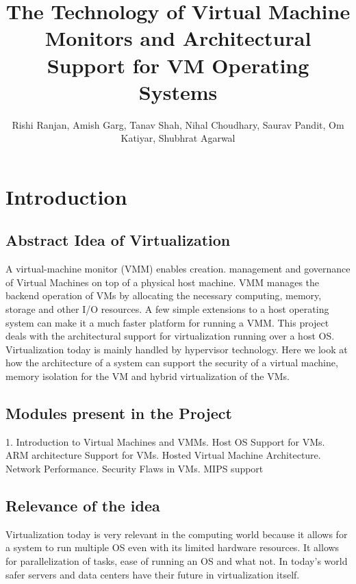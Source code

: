 \documentclass[runningheads]{llncs}
\begin{document}
\title{The Technology of Virtual Machine Monitors and Architectural Support for VM Operating Systems}
%
\author{Rishi Ranjan, Amish Garg, Tanav Shah, Nihal Choudhary, Saurav Pandit, Om Katiyar, Shubhrat Agarwal }
%
\maketitle              %
%
%
%
%
\section{Introduction}
\subsection{Abstract Idea of Virtualization}
\large A virtual-machine monitor (VMM) enables creation. management and governance of Virtual Machines on top of a physical host machine. VMM manages the backend operation of VMs by allocating the necessary computing, memory, storage and other I/O resources. A few simple extensions to a host operating system can make it a much faster platform for running a VMM. This project deals with the architectural support for virtualization running over a host OS. Virtualization today is mainly handled by hypervisor technology. Here we look at how the architecture of a system can support the security of a virtual machine, memory isolation for the VM and hybrid virtualization of the VMs.

\subsection{Modules present in the Project}
1. Introduction to Virtual Machines and VMMs. Host OS Support for VMs. ARM architecture Support for VMs. Hosted Virtual Machine Architecture. Network Performance. Security Flaws in VMs. MIPS support

\subsection{Relevance of the idea}
 Virtualization today is very relevant in the computing world because it allows for a system to run multiple OS even with its limited hardware resources. It allows for parallelization of tasks, ease of running an OS and what not. In today’s world safer servers and data centers have their future in virtualization itself.
\end{document}
